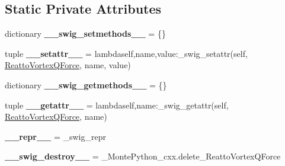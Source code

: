 \subsection*{Static Private Attributes}
\begin{DoxyCompactItemize}
\item 
\hypertarget{classMontePython__cxx_1_1ReattoVortexQForce_ad92125ce70ea1b722d5b6477cc3d4f73}{}dictionary {\bfseries \+\_\+\+\_\+swig\+\_\+setmethods\+\_\+\+\_\+} = \{\}\label{classMontePython__cxx_1_1ReattoVortexQForce_ad92125ce70ea1b722d5b6477cc3d4f73}

\item 
\hypertarget{classMontePython__cxx_1_1ReattoVortexQForce_aa4cc716379d52ea1c7ca97a0a1dceed3}{}tuple {\bfseries \+\_\+\+\_\+setattr\+\_\+\+\_\+} = lambdaself,name,value\+:\+\_\+swig\+\_\+setattr(self, \hyperlink{classMontePython__cxx_1_1ReattoVortexQForce}{Reatto\+Vortex\+Q\+Force}, name, value)\label{classMontePython__cxx_1_1ReattoVortexQForce_aa4cc716379d52ea1c7ca97a0a1dceed3}

\item 
\hypertarget{classMontePython__cxx_1_1ReattoVortexQForce_a6f2d52873e84e1c06a3e78272895e4bd}{}dictionary {\bfseries \+\_\+\+\_\+swig\+\_\+getmethods\+\_\+\+\_\+} = \{\}\label{classMontePython__cxx_1_1ReattoVortexQForce_a6f2d52873e84e1c06a3e78272895e4bd}

\item 
\hypertarget{classMontePython__cxx_1_1ReattoVortexQForce_ad757b5d01ddf8b0c78d7a2672a7a87ae}{}tuple {\bfseries \+\_\+\+\_\+getattr\+\_\+\+\_\+} = lambdaself,name\+:\+\_\+swig\+\_\+getattr(self, \hyperlink{classMontePython__cxx_1_1ReattoVortexQForce}{Reatto\+Vortex\+Q\+Force}, name)\label{classMontePython__cxx_1_1ReattoVortexQForce_ad757b5d01ddf8b0c78d7a2672a7a87ae}

\item 
\hypertarget{classMontePython__cxx_1_1ReattoVortexQForce_a257908be689085b12ffde2112f140937}{}{\bfseries \+\_\+\+\_\+repr\+\_\+\+\_\+} = \+\_\+swig\+\_\+repr\label{classMontePython__cxx_1_1ReattoVortexQForce_a257908be689085b12ffde2112f140937}

\item 
\hypertarget{classMontePython__cxx_1_1ReattoVortexQForce_af1c2079d0bd668782d580c1df7d18183}{}{\bfseries \+\_\+\+\_\+swig\+\_\+destroy\+\_\+\+\_\+} = \+\_\+\+Monte\+Python\+\_\+cxx.\+delete\+\_\+\+Reatto\+Vortex\+Q\+Force\label{classMontePython__cxx_1_1ReattoVortexQForce_af1c2079d0bd668782d580c1df7d18183}

\end{DoxyCompactItemize}


